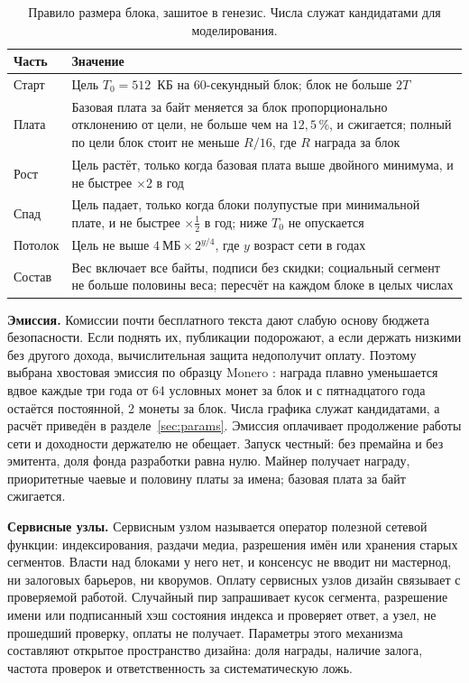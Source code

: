 \documentclass[10pt,a4paper]{article}
\begin{document}
\begin{table}[t]
\centering\small
\caption{Правило размера блока, зашитое в генезис. Числа служат кандидатами для моделирования.}
\label{tab:blocksize}
\footnotesize
\begin{tabular}{L{2.4cm}L{13.6cm}}
\toprule
Часть & Значение \\
\midrule
Старт & Цель $T_0=512$~КБ на 60-секундный блок; блок не больше $2T$ \\
Плата & Базовая плата за байт меняется за блок пропорционально отклонению от цели, не больше чем на $12{,}5\,\%$, и сжигается; полный по цели блок стоит не меньше $R/16$, где $R$ награда за блок \\
Рост & Цель растёт, только когда базовая плата выше двойного минимума, и не быстрее $\times2$ в год \\
Спад & Цель падает, только когда блоки полупустые при минимальной плате, и не быстрее $\times\frac12$ в год; ниже $T_0$ не опускается \\
Потолок & Цель не выше $4~\text{МБ}\times2^{y/4}$, где $y$ возраст сети в годах \\
Состав & Вес включает все байты, подписи без скидки; социальный сегмент не больше половины веса; пересчёт на каждом блоке в целых числах \\
\bottomrule
\end{tabular}
\end{table}

\textbf{Эмиссия.}
Комиссии почти бесплатного текста дают слабую основу бюджета безопасности.
Если поднять их, публикации подорожают, а если держать низкими без другого дохода, вычислительная защита недополучит оплату.
Поэтому выбрана хвостовая эмиссия по образцу Monero \cite{tail}: награда плавно уменьшается вдвое каждые три года от 64 условных монет за блок и с пятнадцатого года остаётся постоянной, 2 монеты за блок.
Числа графика служат кандидатами, а расчёт приведён в разделе~\ref{sec:params}.
Эмиссия оплачивает продолжение работы сети и доходности держателю не обещает.
Запуск честный: без премайна и без эмитента, доля фонда разработки равна нулю.
Майнер получает награду, приоритетные чаевые и половину платы за имена; базовая плата за байт сжигается.

\textbf{Сервисные узлы.}
Сервисным узлом называется оператор полезной сетевой функции: индексирования, раздачи медиа, разрешения имён или хранения старых сегментов.
Власти над блоками у него нет, и консенсус не вводит ни мастернод, ни залоговых барьеров, ни кворумов.
Оплату сервисных узлов дизайн связывает с проверяемой работой.
Случайный пир запрашивает кусок сегмента, разрешение имени или подписанный хэш состояния индекса и проверяет ответ, а узел, не прошедший проверку, оплаты не получает.
Параметры этого механизма составляют открытое пространство дизайна: доля награды, наличие залога, частота проверок и ответственность за систематическую ложь.
\end{document}
